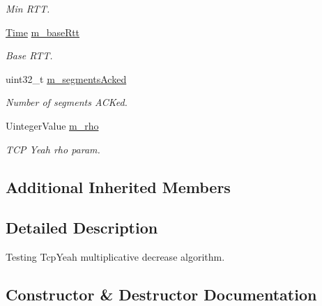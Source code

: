 \begin{DoxyCompactItemize}
\begin{DoxyCompactList}\small\item\em Min R\+TT. \end{DoxyCompactList}\item 
\hyperlink{classns3_1_1Time}{Time} \hyperlink{classTcpYeahDecrementTest_a3086a8d8bda85c67c56b15b29d966334}{m\+\_\+base\+Rtt}
\begin{DoxyCompactList}\small\item\em Base R\+TT. \end{DoxyCompactList}\item 
uint32\+\_\+t \hyperlink{classTcpYeahDecrementTest_a781689c8f518fdfea31ecb3c7b7fafa2}{m\+\_\+segments\+Acked}
\begin{DoxyCompactList}\small\item\em Number of segments A\+C\+Ked. \end{DoxyCompactList}\item 
Uinteger\+Value \hyperlink{classTcpYeahDecrementTest_ad98d7965f6f41d7ab3d8d00f5edcf90a}{m\+\_\+rho}
\begin{DoxyCompactList}\small\item\em T\+CP Yeah rho param. \end{DoxyCompactList}\end{DoxyCompactItemize}
\subsection*{Additional Inherited Members}


\subsection{Detailed Description}
Testing Tcp\+Yeah multiplicative decrease algorithm. 

\subsection{Constructor \& Destructor Documentation}
